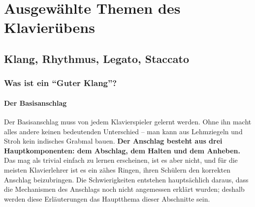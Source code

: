 
\section{Ausgewählte Themen des Klavierübens}
\label{c1iii1}


\subsection{Klang, Rhythmus, Legato, Staccato}

\subsubsection{Was ist ein \enquote{Guter Klang}?}
\label{c1iii1a}

\paragraph{Der Basisanschlag}
\label{c1iii1a1}

Der Basisanschlag muss von jedem Klavierspieler gelernt werden.
Ohne ihn macht alles andere keinen bedeutenden Unterschied -- man kann aus Lehmziegeln und Stroh kein indisches Grabmal bauen.
\textbf{Der Anschlag besteht aus drei Hauptkomponenten: dem Abschlag, dem Halten und dem Anheben.}
Das mag als trivial einfach zu lernen erscheinen, ist es aber nicht, und für die meisten Klavierlehrer ist es ein zähes Ringen, ihren Schülern den korrekten Anschlag beizubringen.
Die Schwierigkeiten entstehen hauptsächlich daraus, dass die Mechanismen des Anschlags noch nicht angemessen erklärt wurden; deshalb werden diese Erläuterungen das Hauptthema dieser Abschnitte sein.

